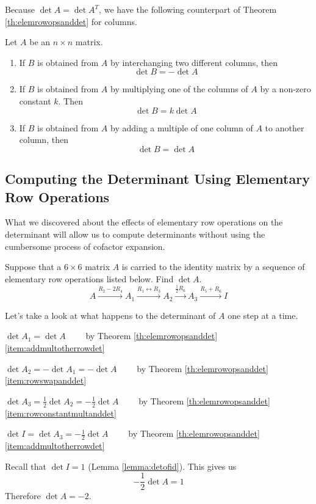 \documentclass{ximera}
\begin{document}
Because $\det{A}=\det{A^T}$, we have the following counterpart of Theorem \ref{th:elemrowopsanddet} for columns.

\begin{theorem}\label{th:elemcolopsanddet}
Let $A$ be an $n\times n$ matrix.  
\begin{enumerate}
\item\label{item:colswapanddet}
If $B$ is obtained from $A$ by interchanging two different columns, then $$\det{B}=-\det{A}$$
\item \label{item:colconstantmultanddet}
If $B$ is obtained from $A$ by multiplying one of the columns of $A$ by a non-zero constant $k$.  Then $$\det{B}=k\det{A}$$
\item \label{item:addmultothercoldet}
If $B$ is obtained from $A$ by adding a multiple of one column of $A$ to another column, then
$$\det{B}=\det{A}$$
\end{enumerate}
\end{theorem}

\subsection*{Computing the Determinant Using Elementary Row Operations}
What we discovered about the effects of elementary row operations on the determinant will allow us to compute determinants without using the cumbersome process of cofactor expansion.

\begin{example}\label{ex:detandelemrowops} Suppose that a $6\times 6$ matrix $A$ is carried to the identity matrix by a sequence of elementary row operations listed below.  Find $\det{A}$.
$$A\xrightarrow{R_2-2R_4}A_1\xrightarrow{R_1\leftrightarrow R_3}A_2\xrightarrow{\frac{1}{2}R_6}A_3\xrightarrow{R_5+R_6}I$$
\begin{explanation}
Let's take a look at what happens to the determinant of $A$ one step at a time.  
\begin{center}
$\det{A_1}=\det{A}\quad\quad$ by Theorem \ref{th:elemrowopsanddet}\ref{item:addmultotherrowdet}

$\det{A_2}=-\det{A_1}=-\det{A}\quad\quad$ by Theorem \ref{th:elemrowopsanddet}\ref{item:rowswapanddet}

$\det{A_3}=\frac{1}{2}\det{A_2}=-\frac{1}{2}\det{A}\quad\quad$ by Theorem \ref{th:elemrowopsanddet}\ref{item:rowconstantmultanddet}

$\det{I}=\det{A_3}=-\frac{1}{2}\det{A}\quad\quad$ by Theorem \ref{th:elemrowopsanddet}\ref{item:addmultotherrowdet}
\end{center}

Recall that $\det{I}=1$ (Lemma \ref{lemma:detofid}).  This gives us
$$-\frac{1}{2}\det{A}=1$$
Therefore $\det{A}=-2$.

\end{explanation}
\end{example}
\end{document}
